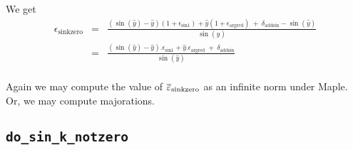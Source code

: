We get
\begin{eqnarray*}
  \epsilon_{\mathrm{sinkzero}} 
  &=& \frac{(\sin(\hat{y})-\hat{y})(1+\epsilon_{\mathrm{sin1}}) + \hat{y}(1+\epsilon_{\mathrm{argred}})    \ +\   \delta_{\mathrm{addsin}} - \sin(\hat{y})}{\sin(\hat{y})}\\
  &=& \frac{(\sin(\hat{y})-\hat{y}).\epsilon_{\mathrm{sin1}} + \hat{y}.\epsilon_{\mathrm{argred}}    \ +\ \delta_{\mathrm{addsin}}}{\sin(\hat{y})}\\
\label{eq:sinkzero}
\end{eqnarray*}

Again we may compute the value of ${\overline{\varepsilon}}_{\mathrm{sinkzero}}$ as an infinite norm under Maple. Or, we may compute majorations.

 



\subsection{\texttt{do\_sin\_k\_notzero}}

